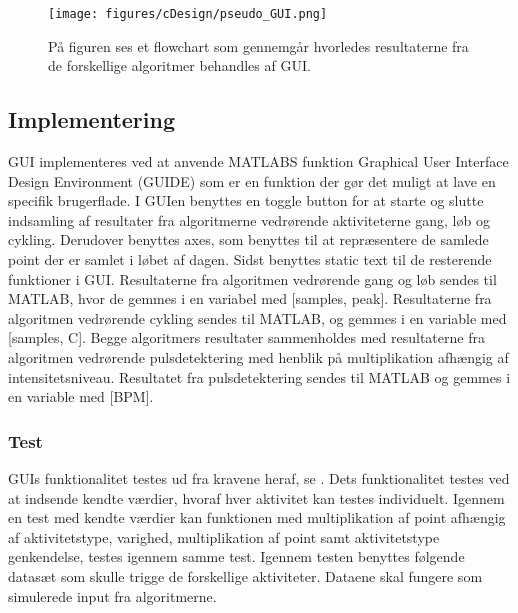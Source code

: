 \begin{figure}[H]
	\centering
	\texttt{[image: figures/cDesign/pseudo\_GUI.png]}
	\caption{På figuren ses et flowchart som gennemgår hvorledes resultaterne fra de forskellige algoritmer behandles af GUI.}
	\label{fig:GUI}
\end{figure}

\subsection{Implementering}
GUI implementeres ved at anvende MATLABS funktion Graphical User Interface Design Environment (GUIDE) som er en funktion der gør det muligt at lave en specifik brugerflade. I GUIen benyttes en toggle button for at starte og slutte indsamling af resultater fra algoritmerne vedrørende aktiviteterne gang, løb og cykling. Derudover benyttes axes, som benyttes til at repræsentere de samlede point der er samlet i løbet af dagen. Sidst benyttes static text til de resterende funktioner i GUI. \newline
Resultaterne fra algoritmen vedrørende gang og løb sendes til MATLAB, hvor de gemmes i en variabel med [samples, peak]. Resultaterne fra algoritmen vedrørende cykling sendes til MATLAB, og gemmes i en variable med [samples, C]. Begge algoritmers resultater sammenholdes med resultaterne fra algoritmen vedrørende pulsdetektering med henblik på multiplikation afhængig af intensitetsniveau. Resultatet fra pulsdetektering sendes til MATLAB og gemmes i en variable med [BPM].

\subsubsection{Test}
GUIs funktionalitet testes ud fra kravene heraf, se . Dets funktionalitet testes ved at indsende kendte værdier, hvoraf hver aktivitet kan testes individuelt. Igennem en test med kendte værdier kan funktionen med multiplikation af point afhængig af aktivitetstype, varighed, multiplikation af point samt aktivitetstype genkendelse, testes igennem samme test.
Igennem testen benyttes følgende datasæt som skulle trigge de forskellige aktiviteter. Dataene skal fungere som simulerede input fra algoritmerne. 

